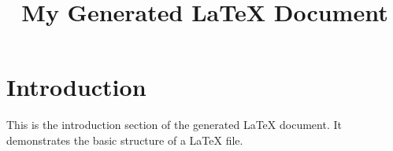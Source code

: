 \documentclass{article}
\title{My Generated LaTeX Document}
\author{}
\date{}
\begin{document}
\maketitle

\section{Introduction}
This is the introduction section of the generated LaTeX document. It demonstrates the basic structure of a LaTeX file.
\end{document}
